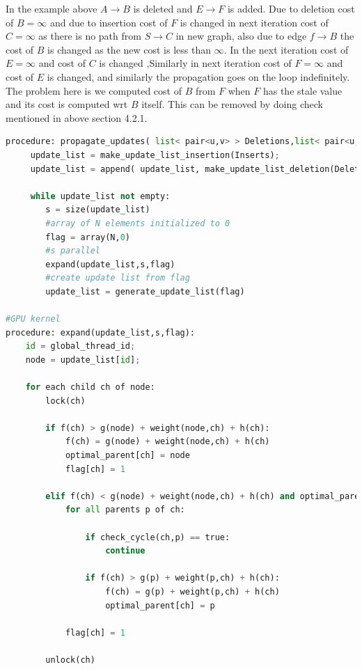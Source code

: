 \documentclass[a4paper]{article}
\begin{document}
In the example above $A \rightarrow B$ is deleted and $E \rightarrow F$ is added. Due to deletion cost of $B = \infty$  and due to insertion cost of $F$ is changed in next iteration cost of $C = \infty$ as there is no path from $S \rightarrow C$ in new graph, also due to edge $f \rightarrow B$ the cost of $B$ is changed as the new cost is less than $\infty$. In the next iteration cost of $E = \infty$ and cost of $C$ is changed ,Similarly in next iteration cost of $F = \infty$ and cost of $E$ is changed, and similarly the propagation goes on the loop indefinitely. The problem here is we computed cost of $B$ from $F$ when $F$ has the stale value and its cost is computed wrt $B$ itself. This can be removed by doing check mentioned in above section 4.2.1. 

\begin{lstlisting}[language=python, caption=Propagation of Updates]
procedure: propagate_updates( list< pair<u,v> > Deletions,list< pair<u,v> > Inserts, E, N):
     update_list = make_update_list_insertion(Inserts);
     update_list = append( update_list, make_update_list_deletion(Deletions) )
     
     while update_list not empty:
        s = size(update_list)
        #array of N elements initialized to 0
        flag = array(N,0)
        #s parallel
        expand(update_list,s,flag)
        #create update list from flag
        update_list = generate_update_list(flag)

#GPU kernel
procedure: expand(update_list,s,flag):
    id = global_thread_id;
    node = update_list[id];
    
    for each child ch of node:
        lock(ch)
        
        if f(ch) > g(node) + weight(node,ch) + h(ch):
            f(ch) = g(node) + weight(node,ch) + h(ch)  
            optimal_parent[ch] = node
            flag[ch] = 1
        
        elif f(ch) < g(node) + weight(node,ch) + h(ch) and optimal_parent[ch] == node:
            for all parents p of ch:
             
                if check_cycle(ch,p) == true:
                    continue
             
                if f(ch) > g(p) + weight(p,ch) + h(ch):
                    f(ch) = g(p) + weight(p,ch) + h(ch)
                    optimal_parent[ch] = p
            
            flag[ch] = 1
        
        unlock(ch)
\end{lstlisting}
\end{document}
